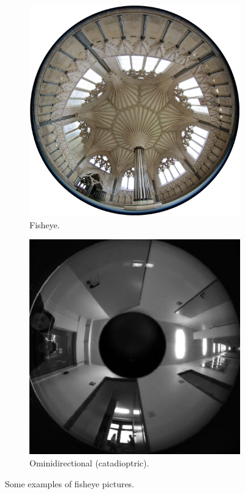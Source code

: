 \begin{figure}[htb]
	\centering
	\begin{subfigure}{0.4\textwidth}
		\centering
		\includegraphics[width=\textwidth]{img/fisheye_example}
		\caption{Fisheye.}
        \label{fig:fisheye_example}
	\end{subfigure}
	\begin{subfigure}{0.4\textwidth}
		\centering
		\includegraphics[width=\textwidth]{img/omnidirectional_example}
		\caption{Ominidirectional (catadioptric).}
        \label{fig:omnidirectional_example}
	\end{subfigure}
	\caption{Some examples of fisheye pictures.}
    \label{fig:wide_fov_pics}
\end{figure}

